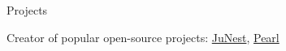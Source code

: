 \begin{cvlist}{Projects}
  \item[\textbullet] Creator of popular open-source projects:
  \href{https://github.com/fsquillace/junest}{JuNest}, \href{https://github.com/pearl-core/pearl}{Pearl}
\end{cvlist}